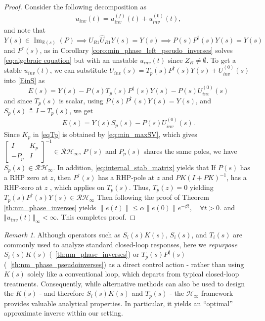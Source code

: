 \documentclass[journal]{IEEEtran}
\theoremstyle{remark}
\newtheorem{remark}{Remark}
\DeclareMathOperator*{\im}{Im}
\begin{document}
\begin{proof}
Consider the following decomposition as
\begin{align}
u_{inv}(t) = u_{inv}^{(f)}(t) + u_{inv}^{(0)}(t),
\end{align}
and note that $Y(s) \in \im_{\mathbb{R}(s)}(P) \implies U_{R1}\hat{U}_{R1}{Y}(s)={Y}(s) \implies P(s)P^\dagger(s)Y(s)=Y(s)$ and $P^{\dagger}(s)$, as in Corollary \ref{coro:min_phase_left_pseudo_inverses} solves \eqref{eq:algebraic equation} but with an unstable $u_{inv}(t)$ since \( Z_R \neq \emptyset \). To get a stable $u_{inv}(t)$, we can substitute $U_{inv}(s)=T_p(s)P^{\dagger}(s)Y(s)+U_{inv}^{(0)}(s)$ into \eqref{EinS} as
\begin{equation*}
 E(s)=Y(s)-P(s)T_p(s)P^\dagger(s)Y(s) -P(s)U_{inv}^{(0)}(s)   
\end{equation*}
and since $T_p(s)$ is scalar, using $P(s)P^\dagger(s)Y(s)=Y(s)$, and $S_p(s) \triangleq I-T_p(s)$, we get 
\begin{align}
 E(s)=Y(s)S_p(s)-P(s)U_{inv}^{(0)}(s).  
\end{align}
Since $K_p$ in \eqref{eqTp} is obtained by \eqref{eq:min_maxSV}, which gives \footnotesize $\begin{bmatrix}
        I & K_p\\
        -P_p & I
\end{bmatrix}^{-1} \in \mathcal{R}\mathcal{H}_\infty$\normalsize, $P(s)$ and $P_p(s)$ shares the same poles, we have $S_p(s) \in \mathcal{RH}_\infty$.
In addition, \eqref{eq:internal_stab_matrix} yields that If $P(s)$ has a RHP zero at $z$, then $P^\dagger(s)$ has a RHP-pole at $z$ and $PK(I+PK)^{-1}$, has a RHP-zero at $z$ \cite{skogestad2005multivariable}, which applies on $T_p(s)$. Thus, $T_p(z)=0$ yielding $T_p(s)P^{\dagger}(s)Y(s) \in \mathcal{RH}_\infty$
Then following the proof of Theorem \ref{th:nm_phase_inverses} yields
\(
\|e(t)\| \leq \alpha \|e(0)\| e^{-\beta t}, \quad \forall t>0.
\)
and $\Vert u_{inv}(t) \Vert_\infty < \infty$. This completes proof.
\end{proof} 
\begin{remark}
Although operators such as $S_i(s)K(s)$, $S_i(s)$, and $T_i(s)$ are commonly used to analyze standard closed-loop responses, here we \emph{repurpose} $S_i(s)K(s)$ (~\ref{th:nm_phase_inverses}) or $T_p(s)P^\dagger(s)$ (~\ref{th:nm_phase_pseudoinverses}) as a direct control action - rather than using $K(s)$ solely like a conventional loop, which departs from typical closed-loop treatments. Consequently, while alternative methods can also be used to design the $K(s)$ - and therefore $S_i(s)K(s)$ and $T_p(s)$ - the $\mathcal{H}_\infty$ framework provides valuable analytical properties. In particular, it yields an “optimal” approximate inverse within our setting.
\end{remark}
\end{document}

